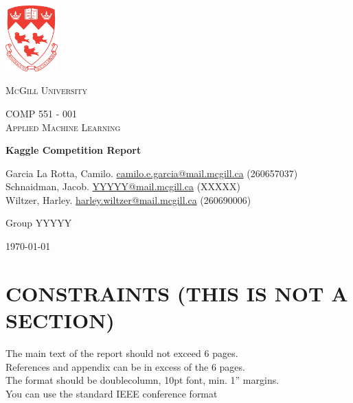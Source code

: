 \documentclass[10pt, hidelinks]{article}
\begin{document}

\begin{titlepage}
    \begin{center}
        \includegraphics[width=0.15\textwidth]{McGillLogo.png}~\par\vspace{1cm}
        {\scshape\LARGE McGill University \par}
        \vspace{1cm}
        {\scshape\Large COMP 551 - 001 \\ Applied Machine Learning\par}
        \vspace{1.5cm}
        {\huge\bfseries Kaggle Competition Report\par}
        \vspace{2cm}
        {\Large Garcia La Rotta, Camilo. \href{mailto:camilo.e.garcia@mail.mcgill.ca}{camilo.e.garcia@mail.mcgill.ca} (260657037)}\\
        {\Large Schnaidman, Jacob. \href{mailto:YYYYY@mail.mcgill.ca}{YYYYY@mail.mcgill.ca} (XXXXX)}\\
        {\Large Wiltzer, Harley. \href{mailto:harley.wiltzer@mail.mcgill.ca}{harley.wiltzer@mail.mcgill.ca} (260690006)}
        \vfill
        {\large Group YYYYY\par}
        \vfill
        {\large \today\par}
    \end{center}
\end{titlepage}

\newpage

\section*{CONSTRAINTS (THIS IS NOT A SECTION)}
The main text of the report should not exceed 6 pages.\\
References and appendix can be in excess of the 6 pages.\\   
The format should be doublecolumn, 10pt font, min. 1” margins.\\  
You can use the standard IEEE conference format
\end{document}
